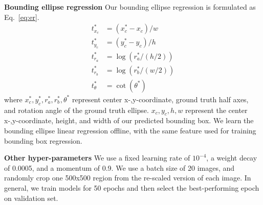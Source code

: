 \documentclass[10pt,twocolumn,letterpaper]{article}
\begin{document}
{\bf Bounding ellipse regression} Our bounding ellipse regression is formulated as Eq.~\eqref{eq:er}. 
\begin{align}
  \label{eq:er}
  t^*_{x_c}  & = (x_c ^* - x_c ) / w  \\ 
  t^*_{y_c}  & = (y_c ^* - y_c ) / h  \\ 
  t^*_{r_a}  & = \log (r^*_a / (h/2)) \\
  t^*_{r_b}  & = \log (r^*_b / (w/2)) \\
  t^*_\theta & = \cot (\theta^*)      
\end{align}
where $x_c^*, y_c^*, r^*_a, r^*_b, \theta^*$ represent center x-,y-coordinate, ground truth half axes, and rotation angle of the ground truth ellipse. $x_c,y_c,h,w$ represent the center x-,y-coordinate, height, and width of our predicted bounding box. We learn the bounding ellipse linear regression offline, with the same feature used for training bounding box regression.

{\bf Other hyper-parameters} We use a fixed learning rate of $10^{-4}$, a weight decay of 0.0005, and a momentum of 0.9. We use a batch size of 20 images, and randomly crop one 500x500 region from the re-scaled version of each image. In general, we train models for 50 epochs and then select the best-performing epoch on validation set.

\clearpage

{
  \small
  
  
}
\end{document}
